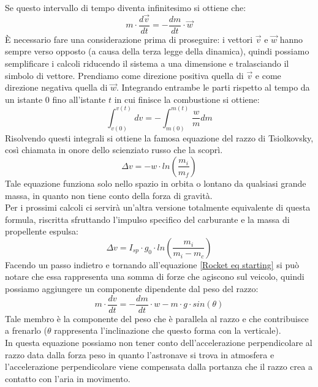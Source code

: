 Se questo intervallo di tempo diventa infinitesimo si ottiene che:
\begin{equation}
    \label{Rocket eq starting}
    m \cdot \frac{d\Vec{v}}{dt} = - \frac{dm}{dt} \cdot \Vec{w}
\end{equation}
È necessario fare una considerazione prima di proseguire: i vettori $\Vec{v}$ e $\Vec{w}$ hanno sempre verso opposto (a causa della terza legge della dinamica), quindi possiamo semplificare i calcoli riducendo il sistema a una dimensione e tralasciando il simbolo di vettore. Prendiamo come direzione positiva quella di $\Vec{v}$ e come direzione negativa quella di $\Vec{w}$.
Integrando entrambe le parti rispetto al tempo da un istante $0$ fino all'istante $t$ in cui finisce la combustione si ottiene:
$$
\int_{v(0)}^{v(t)}dv = -\int_{m(0)}^{m(t)}\frac{w}{m}dm
$$
Risolvendo questi integrali si ottiene la famosa equazione del razzo di Tsiolkovsky, così chiamata in onore dello scienziato russo che la scoprì.
\begin{equation}
    \label{Rocket eq}
    \Delta v = -w \cdot ln\left(\frac{m_i}{m_f}\right)
\end{equation}
Tale equazione funziona solo nello spazio in orbita o lontano da qualsiasi grande massa, in quanto non tiene conto della forza di gravità.\\
Per i prossimi calcoli ci servirà un'altra versione totalmente equivalente di questa formula, riscritta sfruttando l'impulso specifico del carburante e la massa di propellente espulsa:
\begin{equation}
    \label{rocket eq bella}
    \Delta v = I_{sp} \cdot g_0\cdot ln\left(\frac{m_i}{m_i- m_c}\right)
\end{equation}
Facendo un passo indietro e tornando all'equazione \ref{Rocket eq starting} si può notare che essa rappresenta una somma di forze che agiscono sul veicolo, quindi possiamo aggiungere un componente dipendente dal peso del razzo:
\begin{equation}
    \label{Rocket eq starting grav}
    m \cdot \frac{dv}{dt} = - \frac{dm}{dt} \cdot w - m \cdot g \cdot sin (\theta)
\end{equation}
Tale membro è la componente del peso che è parallela al razzo e che contribuisce a frenarlo ($\theta$ rappresenta l'inclinazione che questo forma con la verticale).\\ In questa equazione possiamo non tener conto dell'accelerazione perpendicolare al razzo data dalla forza peso in quanto l'astronave si trova in atmosfera e l'accelerazione perpendicolare viene compensata dalla portanza che il razzo crea a contatto con l'aria in movimento.\\
